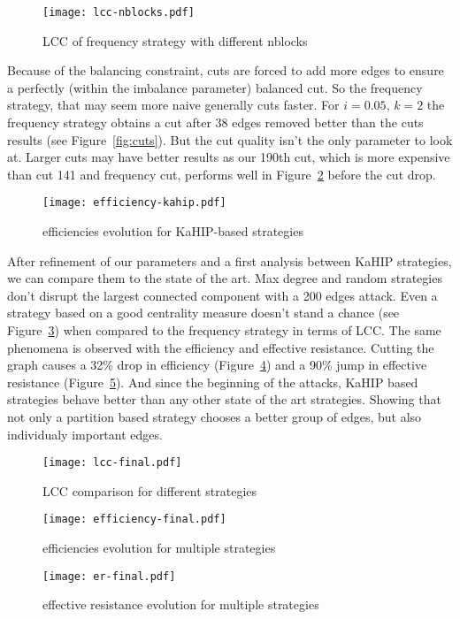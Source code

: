 \begin{figure}[!hbt]
    \centering
    \texttt{[image: lcc-nblocks.pdf]}
    \caption{LCC of frequency strategy with different nblocks}
    \label{fig:lcc-freq-nblocks}
\end{figure}

Because of the balancing constraint, cuts are forced to add more edges to ensure a perfectly (within the imbalance parameter) balanced cut. So the frequency strategy, that may seem more naive generally cuts faster. For $i = 0.05$, $k = 2$ the frequency strategy obtains a cut after 38 edges removed better than the cuts results (see Figure~\ref{fig:cuts}). But the cut quality isn't the only parameter to look at. Larger cuts may have better results as our 190th cut, which is more expensive than cut 141 and frequency cut, performs well in Figure~\ref{fig:efficiency-kahip} before the cut drop.

\begin{figure}[!hbt]
    \centering
    \texttt{[image: efficiency-kahip.pdf]}
    \caption{efficiencies evolution for KaHIP-based strategies}
    \label{fig:efficiency-kahip}
\end{figure}

After refinement of our parameters and a first analysis between KaHIP strategies, we can compare them to the state of the art. Max degree and random strategies don't disrupt the largest connected component with a 200 edges attack. Even a strategy based on a good centrality measure doesn't stand a chance (see Figure~\ref{fig:lcc-strats}) when compared to the frequency strategy in terms of LCC. The same phenomena is observed with the efficiency and effective resistance. Cutting the graph causes a 32\% drop in efficiency (Figure~\ref{fig:efficiency-final}) and a 90\% jump in effective resistance (Figure~\ref{fig:er-final}). And since the beginning of the attacks, KaHIP based strategies behave better than any other state of the art strategies. Showing that not only a partition based strategy chooses a better group of edges, but also individualy important edges.

\begin{figure}[!hbt]
    \centering
    \texttt{[image: lcc-final.pdf]}
    \caption{LCC comparison for different strategies}
    \label{fig:lcc-strats}
\end{figure}

\begin{figure}[!hbt]
    \centering
    \texttt{[image: efficiency-final.pdf]}
    \caption{efficiencies evolution for multiple strategies}
    \label{fig:efficiency-final}
\end{figure}

\begin{figure}[!hbt]
    \centering
    \texttt{[image: er-final.pdf]}
    \caption{effective resistance evolution for multiple strategies}
    \label{fig:er-final}
\end{figure}